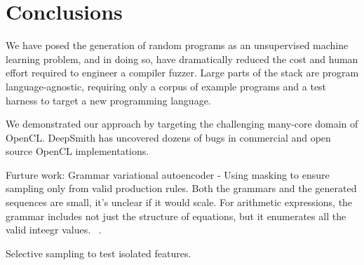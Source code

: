 \section{Conclusions}\label{sec:conclusion}

We have posed the generation of random programs as an unsupervised machine learning problem, and in doing so, have dramatically reduced the cost and human effort required to engineer a compiler fuzzer. Large parts of the stack are program language-agnostic, requiring only a corpus of example programs and a test harness to target a new programming language.

We demonstrated our approach by targeting the challenging many-core domain of OpenCL. DeepSmith has uncovered dozens of bugs in commercial and open source OpenCL implementations.

Furture work: Grammar variational autoencoder - Using masking to ensure sampling only from valid production rules. Both the grammars and the generated sequences are small, it's unclear if it would scale. For arithmetic expressions, the grammar includes not just the structure of equations, but it enumerates all the valid inteegr values. ~\cite{Kusner2017}.

Selective sampling to test isolated features.